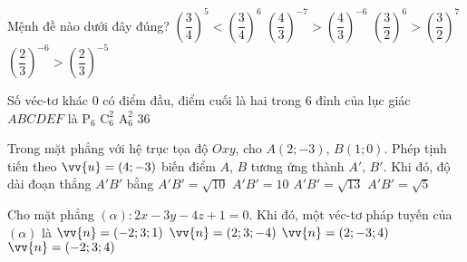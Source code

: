 \begin{ex}%
Mệnh đề nào dưới đây đúng?
\choice
{$\left( \dfrac{3}{4}\right)^5<\left( \dfrac{3}{4}\right)^6$}
{$\left( \dfrac{4}{3}\right)^{-7}>\left( \dfrac{4}{3}\right)^{-6}$}
{$\left( \dfrac{3}{2}\right)^6>\left( \dfrac{3}{2}\right)^7$}
{\True $\left( \dfrac{2}{3}\right)^{-6}>\left( \dfrac{2}{3}\right)^{-5}$}
\end{ex}
\begin{ex}%
Số véc-tơ khác $0$ có điểm đầu, điểm cuối là hai trong $6$ đỉnh của lục giác $ABCDEF$ là
\choice
{$\mathrm{P}_6$}
{$\mathrm{C}_6^2$}
{\True $\mathrm{A}_6^2$}
{$36$}
\end{ex}
\begin{ex}%
Trong mặt phẳng với hệ trục tọa độ $Oxy$, cho $A(2;-3)$, $B(1;0)$. Phép tịnh tiến theo
$\vv{u} = (4; -3)$ biến điểm $A$, $B$ tương ứng thành $A'$, $B '$. Khi đó, độ dài đoạn thẳng $A'B'$ bằng
\choice
{\True $A'B'= \sqrt{10}$}
{$A'B'= 10$}
{$A'B'= \sqrt{13}$}
{$A'B'= \sqrt{5}$}
\end{ex}
\begin{ex}%
Cho mặt phẳng $(\alpha) : 2x-3y-4z+1 = 0$. Khi đó, một véc-tơ pháp tuyến của $(\alpha)$ là
\choice
{$\vv{n}= (-2;3;1)$}
{$\vv{n}= (2;3;-4)$}
{$\vv{n}= (2;-3;4)$}
{\True $\vv{n}= (-2;3;4)$}
\end{ex}
